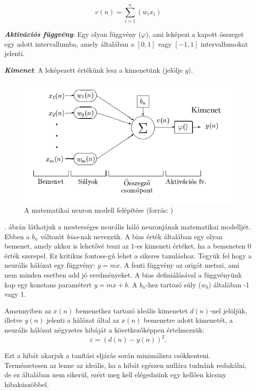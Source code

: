 $$
v(n) = \sum_{i=1}^{n}(w_ix_i)
$$

\textit{\textbf{Aktivációs függvény}}: Egy olyan függvény ($\varphi$), ami leképezi a kapott összeget egy adott intervallumba, amely általában a $[0, 1]$ vagy $[-1, 1]$ intervallumokat jelenti.

\textbf{\textit{Kimenet}}: A leképezett értékünk lesz a kimenetünk (jelölje $y$).

\begin{figure}[h]
	\centering
	\includegraphics[scale=0.6]{images/ANNParts.png}
	\caption{A matematikai neuron modell felépítése (forrás: \cite{neuralis77})}
	\label{fig:ANNParts}
\end{figure}

. ábrán láthatjuk a mesterséges neurális háló neuronjának matematikai modelljét. Ebben a $b_n$ változót \textit{bias}-nak nevezzük. A bias érték általában egy olyan bemenet, amely akkor is lehetővé teszi az $1$-es kimeneti értéket, ha a bemeneten $0$ érték szerepel. Ez kritikus fontoss-gú lehet a sikeres tanuláshoz. Tegyük fel hogy a neurális hálózat egy függvény: $y = mx$. A fenti függvény az origót metszi, ami nem minden esetben add jó eredményeket. A bias definiálásával a függvényünk kap egy konstans paramétert $y = mx + b$. A $b_n$-hez tartozó súly ($w_b$) általában -1 vagy 1.

Amennyiben az $x(n)$ bemenethez tartozó ideális kimenetet $d(n)$-nel jelöljük, illetve $y(n)$ jelenti a hálózat által az $x(n)$ bemenetre adott kimenetét, a neurális hálózat négyzetes hibáját a következőképpen értelmezzük:
$$
\varepsilon = (d(n) - y(n))^2.
$$

Ezt a hibát akarjuk a tanítási eljárás során minimálisra csökkenteni. Természetesen az lenne az ideális, ha a hibát egészen nullára tudnánk redukálni, de ez általában nem sikerül, ezért meg kell elégednünk egy kellően kicsiny hibaküszöbbel.

